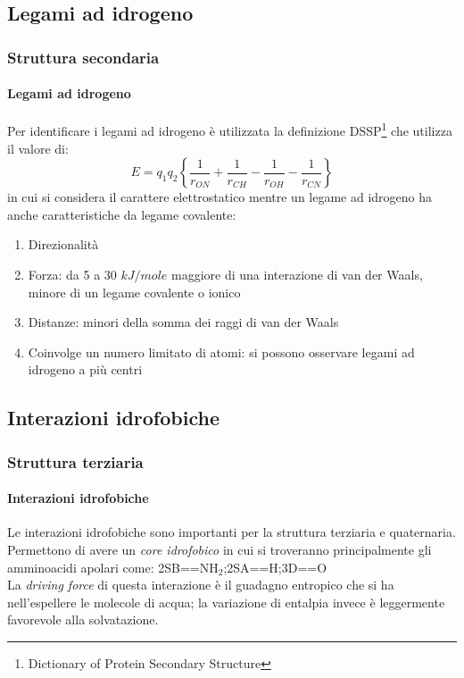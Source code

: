 \documentclass{beamer}
\begin{document}
\subsection{Legami ad idrogeno}
\begin{frame}
  \frametitle{Struttura secondaria}
  \framesubtitle{Legami ad idrogeno}
Per identificare i legami ad idrogeno è utilizzata la definizione DSSP\footnote{Dictionary of Protein Secondary Structure} che utilizza il valore di:
$$ E = q_{1} q_{2} \left\{ \frac{1}{r_{ON}} +  \frac{1}{r_{CH}} - \frac{1}{r_{OH}} - \frac{1}{r_{CN}} \right\}  $$
in cui si considera il carattere elettrostatico mentre un legame ad idrogeno ha anche caratteristiche da legame covalente: \pause
  \begin{enumerate}
  \item Direzionalità\pause
  \item Forza: da 5 a 30 $kJ/mole$ maggiore di una interazione di van der Waals, minore di un legame covalente o ionico\pause
  \item Distanze: minori della somma dei raggi di van der Waals\pause
  \item Coinvolge un numero limitato di atomi: si possono osservare legami ad idrogeno a più centri
  \end{enumerate}

\end{frame}

\subsection{Interazioni idrofobiche}
\begin{frame}
  \frametitle{Struttura terziaria}
  \framesubtitle{Interazioni idrofobiche}
  Le interazioni idrofobiche sono importanti per la struttura terziaria e quaternaria. Permettono di avere un \emph{core idrofobico} 
in cui si troveranno principalmente gli amminoacidi apolari come:\pause
\changeunitlength{0.06pt}
 {2SB==NH$_2$;2SA==H;3D==O}
\\ \pause
La \emph{driving force} di questa interazione è il guadagno entropico che si ha nell'espellere le molecole di acqua; 
la variazione di entalpia invece è leggermente favorevole alla solvatazione.

  
\end{frame}
\end{document}
